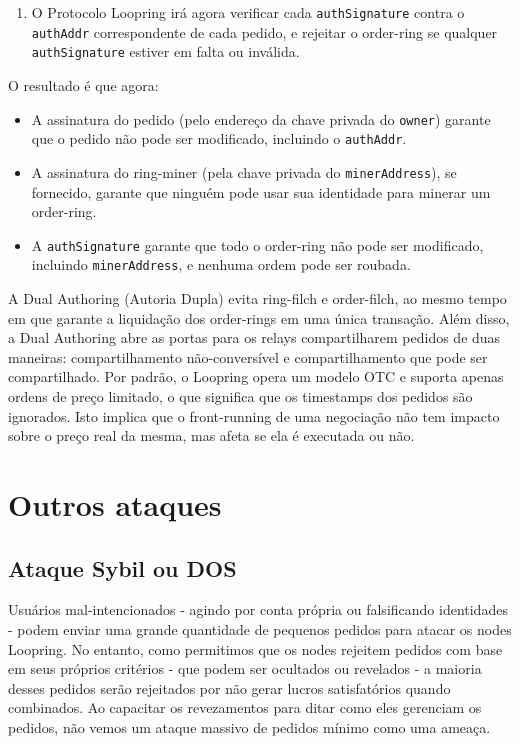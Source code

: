 \documentclass[UTF8,nofonts]{article}
\begin{document}
\begin{multicols}{2}
\begin{enumerate}
	\item O Protocolo Loopring irá agora verificar cada \verb|authSignature| contra o \verb|authAddr| correspondente de cada pedido, e rejeitar o order-ring se qualquer \verb|authSignature| estiver em falta ou inválida.
 
\end{enumerate}

O resultado é que agora:

\begin{itemize}

	\item  A assinatura do pedido (pelo endereço da chave privada do \verb|owner|) garante que o pedido não pode ser modificado, incluindo o \verb|authAddr|.
	\item  A assinatura do ring-miner (pela chave privada do \verb|minerAddress|), se fornecido, garante que ninguém pode usar sua identidade para minerar um order-ring.
	\item  A \verb|authSignature| garante que todo o order-ring não pode ser modificado, incluindo \verb|minerAddress|, e nenhuma ordem pode ser roubada.

\end{itemize}

A Dual Authoring (Autoria Dupla) evita ring-filch  e order-filch, ao mesmo tempo em que garante a liquidação dos order-rings em uma única transação. Além disso, a Dual Authoring abre as portas para os relays compartilharem pedidos de duas maneiras: compartilhamento não-conversível e compartilhamento que pode ser compartilhado. Por padrão, o Loopring opera um modelo OTC e suporta apenas ordens de preço limitado, o que significa que os timestamps dos pedidos são ignorados. Isto implica que o front-running de uma negociação não tem impacto sobre o preço real da mesma, mas afeta se ela é executada ou não.

\section{Outros ataques}

\subsection{Ataque Sybil ou DOS}
Usuários mal-intencionados - agindo por conta própria ou falsificando identidades - podem enviar uma grande quantidade de pequenos pedidos para atacar os nodes Loopring. No entanto, como permitimos que os nodes rejeitem pedidos com base em seus próprios critérios - que podem ser ocultados ou revelados - a maioria desses pedidos serão rejeitados por não gerar lucros satisfatórios quando combinados. Ao capacitar os revezamentos para ditar como eles gerenciam os pedidos, não vemos um ataque massivo de pedidos mínimo como uma ameaça.


\end{multicols}
\end{document}
